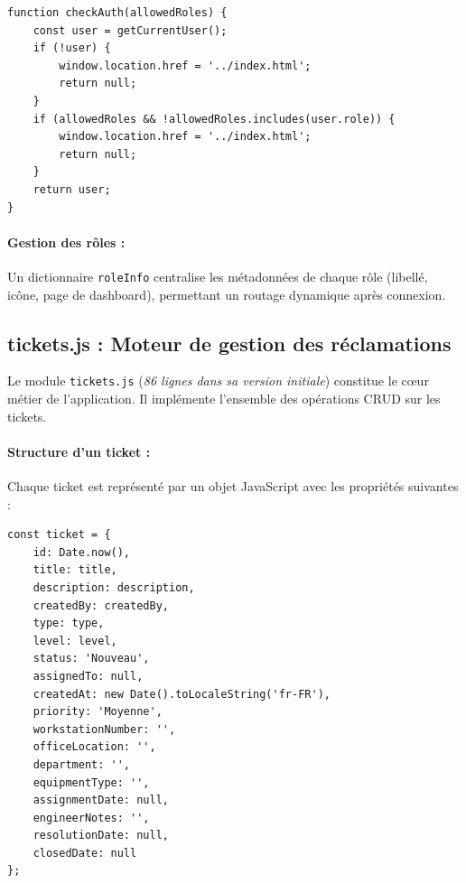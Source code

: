 \documentclass[12pt,a4paper,twoside]{report}
\begin{document}
\begin{lstlisting}[style=jsstyle]
function checkAuth(allowedRoles) {
    const user = getCurrentUser();
    if (!user) {
        window.location.href = '../index.html';
        return null;
    }
    if (allowedRoles && !allowedRoles.includes(user.role)) {
        window.location.href = '../index.html';
        return null;
    }
    return user;
}
\end{lstlisting}

\paragraph{Gestion des rôles :}
Un dictionnaire \texttt{roleInfo} centralise les métadonnées de chaque rôle (libellé, icône, page de dashboard), permettant un routage dynamique après connexion.

\subsection{tickets.js : Moteur de gestion des réclamations}

Le module \texttt{tickets.js} (\textit{86 lignes dans sa version initiale}) constitue le cœur métier de l'application. Il implémente l'ensemble des opérations CRUD sur les tickets.

\paragraph{Structure d'un ticket :}
Chaque ticket est représenté par un objet JavaScript avec les propriétés suivantes :

\begin{lstlisting}[style=jsstyle]
const ticket = {
    id: Date.now(),
    title: title,
    description: description,
    createdBy: createdBy,
    type: type,
    level: level,
    status: 'Nouveau',
    assignedTo: null,
    createdAt: new Date().toLocaleString('fr-FR'),
    priority: 'Moyenne',
    workstationNumber: '',
    officeLocation: '',
    department: '',
    equipmentType: '',
    assignmentDate: null,
    engineerNotes: '',
    resolutionDate: null,
    closedDate: null
};
\end{lstlisting}
\end{document}
